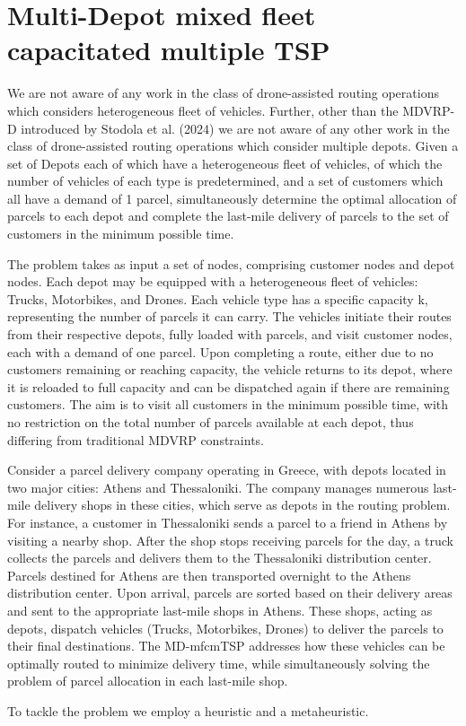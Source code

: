 \documentclass[twocolumn]{article}
\begin{document}
	\section{Multi-Depot mixed fleet capacitated multiple TSP}
	We are not aware of any work in the class of drone-assisted routing operations which considers heterogeneous fleet of vehicles.
	Further, other than the MDVRP-D introduced by Stodola et al. (2024) we are not aware of any other work in the class of drone-assisted routing operations which consider multiple depots. 
	Given a set of Depots each of which have a heterogeneous fleet of vehicles, of which the number of vehicles of each type is predetermined, and a set of customers which all have a demand of 1 parcel, simultaneously determine the optimal allocation of parcels to each depot and complete the last-mile delivery of parcels to the set of customers in the minimum possible time.
	\par
	The problem takes as input a set of nodes, comprising customer nodes and depot nodes. Each depot may be equipped with a heterogeneous fleet of vehicles: Trucks, Motorbikes, and Drones. Each vehicle type has a specific capacity k, representing the number of parcels it can carry. The vehicles initiate their routes from their respective depots, fully loaded with parcels, and visit customer nodes, each with a demand of one parcel. Upon completing a route, either due to no customers remaining or reaching capacity,  the vehicle returns to its depot, where it is reloaded to full capacity and can be dispatched again if there are remaining customers. The aim is to visit all customers in the minimum possible time, with no restriction on the total number of parcels available at each depot, thus differing from traditional MDVRP constraints.
	\par
	Consider a parcel delivery company operating in Greece, with depots located in two major cities: Athens and Thessaloniki. The company manages numerous last-mile delivery shops in these cities, which serve as depots in the routing problem. For instance, a customer in Thessaloniki sends a parcel to a friend in Athens by visiting a nearby shop. After the shop stops receiving parcels for the day, a truck collects the parcels and delivers them to the Thessaloniki distribution center. Parcels destined for Athens are then transported overnight to the Athens distribution center.
	Upon arrival, parcels are sorted based on their delivery areas and sent to the appropriate last-mile shops in Athens. These shops, acting as depots, dispatch vehicles (Trucks, Motorbikes, Drones) to deliver the parcels to their final destinations. The MD-mfcmTSP addresses how these vehicles can be optimally routed to minimize delivery time, while simultaneously solving the problem of parcel allocation in each last-mile shop.
	\par
	To tackle the problem we employ a heuristic and a metaheuristic.
\end{document}
